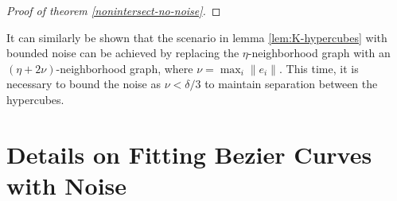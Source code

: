\documentclass[12pt]{article}
\begin{document}
\begin{proof}[Proof of theorem \ref{nonintersect-no-noise}]
\end{proof}

It can similarly be shown that the scenario in lemma
\ref{lem:K-hypercubes} with bounded noise can be achieved by replacing
the \(\eta\)-neighborhood graph with an \((\eta + 2 \nu)\)-neighborhood
graph, where \(\nu = \max_i \|e_i\|\). This time, it is necessary to
bound the noise as \(\nu < \delta / 3\) to maintain separation between
the hypercubes.

\section{Details on Fitting Bezier Curves with Noise}



\end{document}
